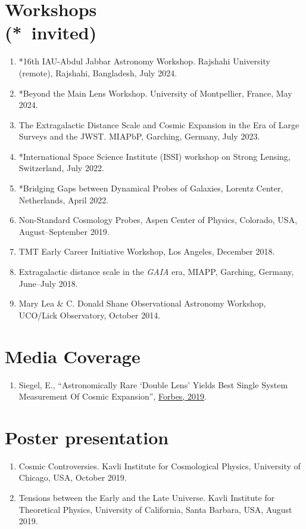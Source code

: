 \documentclass[margin, line]{res}
\begin{document}
\begin{resume}
\section{\sc Workshops \\ ({*}\ invited)}
\begin{enumerate}
	\item *16th IAU-Abdul Jabbar Astronomy Workshop. Rajshahi University (remote), Rajshahi, Bangladesh, July 2024.
	\item *Beyond the Main Lens Workshop. University of Montpellier, France, May 2024.
	\item The Extragalactic Distance Scale and Cosmic Expansion in the Era of Large Surveys and the JWST. MIAPbP, Garching, Germany, July 2023.
	\item *International Space Science Institute (ISSI) workshop on Strong Lensing, Switzerland, July 2022.
	\item *Bridging Gaps between Dynamical Probes of Galaxies, Lorentz Center, Netherlands, April 2022.
	\item Non-Standard Cosmology Probes, Aspen Center of Physics, Colorado, USA, August--September 2019.
	\item TMT Early Career Initiative Workshop, Los Angeles, December 2018.
	\item Extragalactic distance scale in the \textit{GAIA} era, MIAPP, Garching, Germany, June--July 2018.
	\item Mary Lea \& C. Donald Shane Observational Astronomy Workshop, UCO/Lick Observatory, October 2014.
\end{enumerate}


\section{\sc Media Coverage}
\begin{enumerate}
	\item Siegel, E., ``Astronomically Rare `Double Lens' Yields Best Single System Measurement Of Cosmic Expansion'', \href{https://www.forbes.com/sites/startswithabang/2019/10/28/astronomically-rare-double-lens-yields-best-single-system-measurement-of-cosmic-expansion/#55acbc504373}{Forbes, 2019}.	
\end{enumerate}


\section{\sc Poster presentation}
\begin{enumerate}
	\item Cosmic Controversies. Kavli Institute for Cosmological Physics, University of Chicago, USA, October 2019.
	\item Tensions between the Early and the Late Universe. Kavli Institute for Theoretical Physics, University of California, Santa Barbara, USA, August 2019.
\end{enumerate}



\end{resume}
\end{document}

